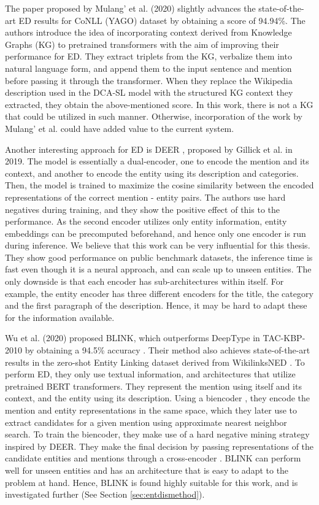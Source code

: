 \documentclass{report}
\theoremstyle{definition}
\theoremstyle{remark}
\begin{document}
The paper proposed by Mulang' et al. (2020) \cite{mulang} slightly advances the state-of-the-art ED results for CoNLL (YAGO) dataset by obtaining a score of 94.94\%. The authors introduce the idea of incorporating context derived from Knowledge Graphs (KG) to pretrained transformers with the aim of improving their performance for ED. They extract triplets from the KG, verbalize them into natural language form, and append them to the input sentence and mention before passing it through the transformer. When they replace the Wikipedia description used in the DCA-SL model \cite{dca} with the structured KG context they extracted, they obtain the above-mentioned score. In this work, there is not a KG that could be utilized in such manner. Otherwise, incorporation of the work by Mulang' et al. \cite{mulang} could have added value to the current system.

Another interesting approach for ED is DEER \cite{googleintern},  proposed by Gillick et al. in 2019. The model is essentially a dual-encoder, one to encode the mention and its context, and another to encode the entity using its description and categories. Then, the model is trained to maximize the cosine similarity between the encoded representations of the correct mention - entity pairs. The authors use hard negatives during training, and they show the positive effect of this to the performance.  As the second encoder utilizes only entity information, entity embeddings can be precomputed beforehand, and hence only one encoder is run during inference. We believe that this work can be very influential for this thesis. They show good performance on public benchmark datasets, the inference time is fast even though it is a neural approach, and can scale up to unseen entities. The only downside is that each encoder has sub-architectures within itself. For example, the entity encoder has three different encoders for the title, the category and the first paragraph of the description. Hence, it may be hard to adapt these for the information available.

Wu et al. (2020) \cite{scalablezeroshot} proposed BLINK, which outperforms DeepType in TAC-KBP-2010 by obtaining a 94.5\% accuracy . Their method also achieves state-of-the-art results in the zero-shot Entity Linking dataset derived from WikilinksNED \cite{wikilinksned}. To perform ED, they only use textual information, and architectures that utilize pretrained BERT transformers. They represent the mention using itself and its context, and the entity using its description. Using a biencoder \cite{polyencoders}, they encode the mention and entity representations in the same space, which they later use to extract candidates for a given mention using approximate nearest neighbor search. To train the biencoder, they make use of a hard negative mining strategy inspired by DEER. They make the final decision by passing representations of the candidate entities and mentions through a cross-encoder \cite{polyencoders}. BLINK can perform well for unseen entities and has an architecture that is easy to adapt to the problem at hand. Hence, BLINK is found highly suitable for this work, and is investigated further (See Section \ref{sec:entdismethod}). 
\end{document}
